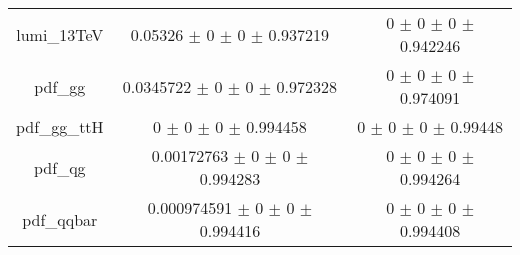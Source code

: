 \begin{table}
\begin{tabular}{ccc}
lumi\_13TeV & \num{0.05326} $\pm$ \num{0} $\pm$ \num{0} $\pm$ \num{0.937219} & \num{0} $\pm$ \num{0} $\pm$ \num{0} $\pm$ \num{0.942246}\\
pdf\_gg & \num{0.0345722} $\pm$ \num{0} $\pm$ \num{0} $\pm$ \num{0.972328} & \num{0} $\pm$ \num{0} $\pm$ \num{0} $\pm$ \num{0.974091}\\
pdf\_gg\_ttH & \num{0} $\pm$ \num{0} $\pm$ \num{0} $\pm$ \num{0.994458} & \num{0} $\pm$ \num{0} $\pm$ \num{0} $\pm$ \num{0.99448}\\
pdf\_qg & \num{0.00172763} $\pm$ \num{0} $\pm$ \num{0} $\pm$ \num{0.994283} & \num{0} $\pm$ \num{0} $\pm$ \num{0} $\pm$ \num{0.994264}\\
pdf\_qqbar & \num{0.000974591} $\pm$ \num{0} $\pm$ \num{0} $\pm$ \num{0.994416} & \num{0} $\pm$ \num{0} $\pm$ \num{0} $\pm$ \num{0.994408}\\
\bottomrule
\end{tabular}
\end{table}